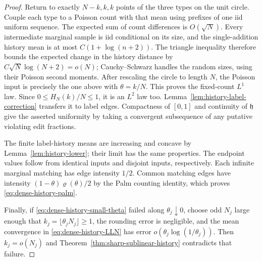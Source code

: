 \documentclass[11pt,letterpaper]{article}
\begin{document}
\begin{proof}
Return to exactly $N-k,k,k$ points of the three types on the unit
circle. Couple each type to a Poisson count with that mean using
prefixes of one iid uniform sequence. The expected sum of count
differences is $O(\sqrt N)$. Every intermediate marginal sample
is iid conditional on its size, and the single-addition history
mean is at most $C(1+\log(n+2))$. The triangle inequality therefore
bounds the expected change in the history distance by
$C\sqrt N\log(N+2)=o(N)$; Cauchy--Schwarz handles the random sizes,
using their Poisson second moments. After rescaling the circle to
length $N$, the Poisson input is precisely the one above with
$\theta=k/N$. This proves the fixed-count $L^1$ law. Since
$0\le H_N(k)/N\le1$, it is an $L^2$ law too.
Lemma~\ref{lem:history-label-correction} transfers it to label edges.
Compactness of $[0,1]$ and continuity of $\mathfrak h$ give the
asserted uniformity by taking a convergent subsequence of any
putative violating edit fractions.

The finite label-history means are increasing and concave by
Lemma~\ref{lem:history-lower}; their limit has the same properties.
The endpoint values follow from identical inputs and disjoint
inputs, respectively. Each infinite marginal matching has edge
intensity $1/2$. Common matching edges have intensity
$(1-\theta)\varrho(\theta)/2$ by the Palm counting identity,
which proves \eqref{eq:dense-history-palm}.

Finally, if \eqref{eq:dense-history-small-theta} failed along
$\theta_j\downarrow0$, choose odd $N_j$ large enough that
$k_j=\lfloor\theta_jN_j\rfloor\ge1$, the rounding error is negligible,
and the mean convergence in \eqref{eq:dense-history-LLN} has error
$o(\theta_j\log(1/\theta_j))$. Then $k_j=o(N_j)$ and
Theorem~\ref{thm:sharp-sublinear-history} contradicts that failure.
\end{proof}
\end{document}
